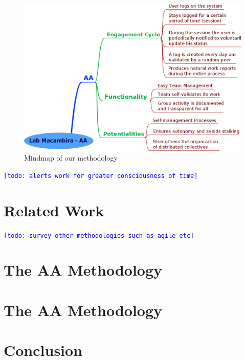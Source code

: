 \documentclass[letterpaper]{article}
\newcommand{\indraftnote}[1]{\textcolor{blue}{\texttt{\footnotesize[#1]}}}
\newcommand{\todo}[1]{\indraftnote{todo: #1}}
\begin{document}
\begin{figure}
\begin{center}
   \includegraphics[width=0.8\linewidth,keepaspectratio=true]{figs/aa-mm.png}
\end{center}
   \caption{
   Mindmap of our methodology
   }
\label{fig:mm}
\end{figure}

\todo{alerts work for greater consciousness of time}

\section{Related Work}
\todo{survey other methodologies such as agile etc}

\section{The AA Methodology}

\section{The AA Methodology}

\section{Conclusion}


%
%


\end{document}
